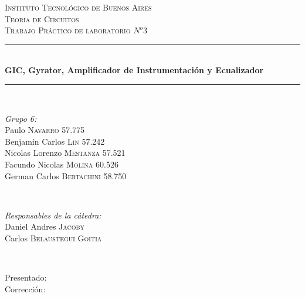 \begin{titlepage}
\newcommand{\HRule}{\rule{\linewidth}{0.5mm}}
\center
\textsc{\LARGE Instituto Tecnológico de Buenos Aires}\\[1.5cm]
\textsc{\Large Teoria de Circuitos}\\[0.5cm]
\textsc{\large Trabajo Práctico de laboratorio $N^o3$}\\[0.5cm]

\HRule \\[0.4cm]
{ \huge \bfseries GIC, Gyrator, Amplificador de Instrumentación y Ecualizador}\\[0.1cm] %
\HRule \\[1.5cm]

\begin{minipage}{0.4\textwidth}
\begin{flushleft} \large
\emph{Grupo 6:}\\
Paulo \textsc{Navarro} 57.775\\
Benjamín Carlos \textsc{Lin} 57.242\\
Nicolas Lorenzo  \textsc{Mestanza} 57.521\\
Facundo Nicolas \textsc{Molina} 60.526\\
German Carlos  \textsc{Bertachini} 58.750\\
\end{flushleft}
\end{minipage}
~
\begin{minipage}{0.4\textwidth}
\begin{flushright} \large
\emph{Responsables de la cátedra:} \\
Daniel Andres \textsc{Jacoby}\\
Carlos \textsc{Belaustegui Goitia}\\

\end{flushright}
\end{minipage}\\[4cm]

\begin{minipage}{0.4\textwidth}
\begin{flushleft} \large
Presentado: \\
Corrección:\\
\end{flushleft}
\end{minipage}
\vfill %

\end{titlepage}
